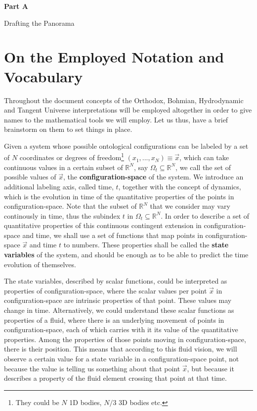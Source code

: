 \documentclass[11pt, a4paper]{article} %
\newcommand{\R}{\mathbb{R}} %
\newenvironment{kapituloBerria}[1][]
  {\clearpage           %
   \thispagestyle{empty}%
   \vspace*{\stretch{2}}%
   \raggedleft          %
   {\textbf{{\fontsize{60}{40}\selectfont \hspace{+9.5cm}#1\newline \newline}}}
   \bf
   \fontsize{30}{20}\selectfont
  }
  {\par %
   \vspace{\stretch{3}} %
   \clearpage           %
  }
\begin{document}
\newpage

\begin{kapituloBerria}[Part A]
Drafting the Panorama
\end{kapituloBerria}

\pagestyle{fancy}

\section*{On the Employed Notation and Vocabulary}

Throughout the document concepts of the Orthodox, Bohmian, Hydrodynamic and Tangent Universe interpretations will be employed altogether in order to give names to the mathematical tools we will employ. Let us thus, have a brief brainstorm on them to set things in place.

Given a system whose possible ontological configurations can be labeled by a set of $N$ coordinates or degrees of freedom\footnote{They could be $N$ 1D bodies, $N/3$ 3D bodies etc.} $(x_1, ...,x_N)\equiv \vec{x}$, which can take continuous values in a certain subset of $\R^N$, say $\Omega_t\subseteq \R^N$, we call the set of possible values of $\vec{x}$, the {\bf configuration-space} of the system. We introduce an additional labeling axis, called time, $t$, together with the concept of dynamics, which is the evolution in time of the quantitative properties of the points in configuration-space. Note that the subset of $\R^N$ that we consider may vary continously in time, thus the subindex $t$ in $\Omega_t\subseteq \R^N$. In order to describe a set of quantitative properties of this continuous contingent extension in configuration-space and time, we shall use a set of functions that map points in configuration-space $\vec{x}$ and time $t$ to numbers. These properties shall be called the {\bf state variables} of the system, and should be enough as to be able to predict the time evolution of themselves. 

The state variables, described by scalar functions, could be interpreted as properties of configuration-space, where the scalar values per point $\vec{x}$ in configuration-space are intrinsic properties of that point. These values may change in time. Alternatively, we could understand these scalar functions as properties of a fluid, where there is an underlying movement of points in configuration-space, each of which carries with it its value of the quantitative properties. Among the properties of those points moving in configuration-space, there is their position. This means that according to this fluid vision, we will observe a certain value for a state variable in a configuration-space point, not because the value is telling us something about that point $\vec{x}$, but because it describes a property of the fluid element crossing that point at that time.
\end{document}
